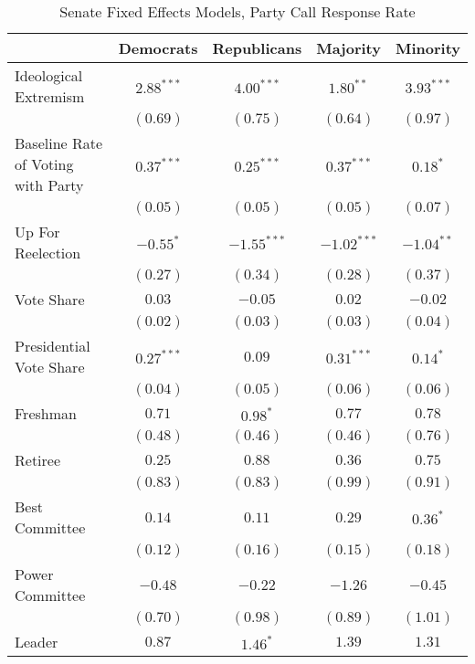\documentclass[12pt]{article}
\begin{document}
\begin{table}[H]
	\begin{center}
		\caption{Senate Fixed Effects Models, Party Call Response Rate}
		\begin{tabular}{l c c c c }
			\hline
			& Democrats & Republicans & Majority & Minority \\
			\hline
			Ideological Extremism  & $2.88^{***}$ & $4.00^{***}$  & $1.80^{**}$   & $3.93^{***}$ \\
			& $(0.69)$     & $(0.75)$      & $(0.64)$      & $(0.97)$     \\
			Baseline Rate of Voting with Party               & $0.37^{***}$ & $0.25^{***}$  & $0.37^{***}$  & $0.18^{*}$   \\
			& $(0.05)$     & $(0.05)$      & $(0.05)$      & $(0.07)$     \\
			Up For Reelection     & $-0.55^{*}$  & $-1.55^{***}$ & $-1.02^{***}$ & $-1.04^{**}$ \\
			& $(0.27)$     & $(0.34)$      & $(0.28)$      & $(0.37)$     \\
			Vote Share             & $0.03$       & $-0.05$       & $0.02$        & $-0.02$      \\
			& $(0.02)$     & $(0.03)$      & $(0.03)$      & $(0.04)$     \\
			Presidential Vote Share       & $0.27^{***}$ & $0.09$        & $0.31^{***}$  & $0.14^{*}$   \\
			& $(0.04)$     & $(0.05)$      & $(0.06)$      & $(0.06)$     \\
			Freshman                & $0.71$       & $0.98^{*}$    & $0.77$        & $0.78$       \\
			& $(0.48)$     & $(0.46)$      & $(0.46)$      & $(0.76)$     \\
			Retiree                 & $0.25$       & $0.88$        & $0.36$        & $0.75$       \\
			& $(0.83)$     & $(0.83)$      & $(0.99)$      & $(0.91)$     \\
			Best Committee         & $0.14$       & $0.11$        & $0.29$        & $0.36^{*}$   \\
			& $(0.12)$     & $(0.16)$      & $(0.15)$      & $(0.18)$     \\
			Power Committee        & $-0.48$      & $-0.22$       & $-1.26$       & $-0.45$      \\
			& $(0.70)$     & $(0.98)$      & $(0.89)$      & $(1.01)$     \\
			Leader                  & $0.87$       & $1.46^{*}$    & $1.39$        & $1.31$       \\

\end{tabular}
\end{center}
\end{table}
\end{document}
